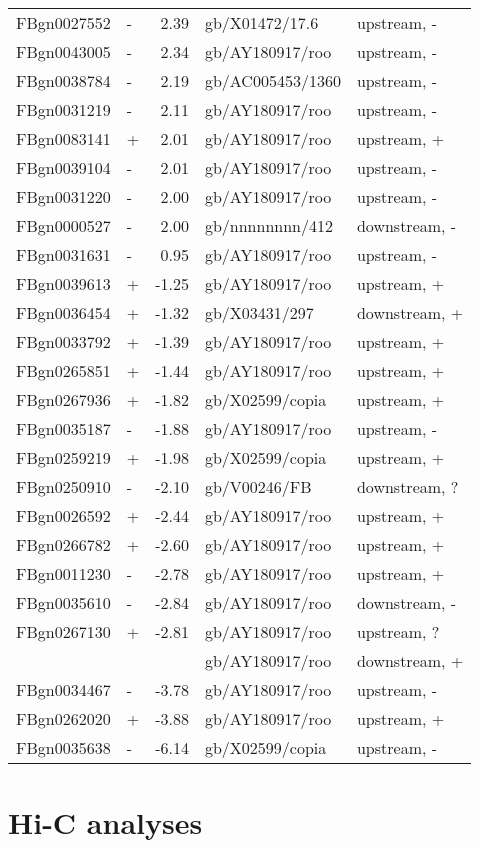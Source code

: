 {\begin{longtable}{llrll}
    FBgn0027552 &   -   &   2.39    &    gb/X01472/17.6     &   upstream, -     \\
    FBgn0043005 &   -   &   2.34    &    gb/AY180917/roo    &   upstream, -     \\
    FBgn0038784 &   -   &   2.19    &    gb/AC005453/1360   &   upstream, -     \\
    FBgn0031219 &   -   &   2.11    &    gb/AY180917/roo    &   upstream, -     \\
    FBgn0083141 &   +   &   2.01    &    gb/AY180917/roo    &   upstream, +     \\
    FBgn0039104 &   -   &   2.01    &    gb/AY180917/roo    &   upstream, -     \\
    FBgn0031220 &   -   &   2.00    &    gb/AY180917/roo    &   upstream, -     \\
    FBgn0000527 &   -   &   2.00    &    gb/nnnnnnnn/412    &   downstream, -   \\
    FBgn0031631 &   -   &   0.95    &    gb/AY180917/roo    &   upstream, -     \\
    FBgn0039613 &   +   &   -1.25   &    gb/AY180917/roo    &   upstream, +     \\
    FBgn0036454 &   +   &   -1.32   &    gb/X03431/297      &   downstream, +   \\
    FBgn0033792 &   +   &   -1.39   &    gb/AY180917/roo    &   upstream, +     \\
    FBgn0265851 &   +   &   -1.44   &    gb/AY180917/roo    &   upstream, +     \\
    FBgn0267936 &   +   &   -1.82   &    gb/X02599/copia    &   upstream, +     \\
    FBgn0035187 &   -   &   -1.88   &    gb/AY180917/roo    &   upstream, -     \\
    FBgn0259219 &   +   &   -1.98   &    gb/X02599/copia    &   upstream, +     \\
    FBgn0250910 &   -   &   -2.10   &    gb/V00246/FB       &   downstream, ?   \\
    FBgn0026592 &   +   &   -2.44   &    gb/AY180917/roo    &   upstream, +     \\
    FBgn0266782 &   +   &   -2.60   &    gb/AY180917/roo    &   upstream, +     \\
    FBgn0011230 &   -   &   -2.78   &    gb/AY180917/roo    &   upstream, +     \\
    FBgn0035610 &   -   &   -2.84   &    gb/AY180917/roo    &   downstream, -   \\
    FBgn0267130 &   +   &   -2.81   &    gb/AY180917/roo    &   upstream, ?     \\
                &       &           &    gb/AY180917/roo    &   downstream, +   \\
    FBgn0034467 &   -   &   -3.78   &    gb/AY180917/roo    &   upstream, -     \\
    FBgn0262020 &   +   &   -3.88   &    gb/AY180917/roo    &   upstream, +     \\
    FBgn0035638 &   -   &   -6.14   &    gb/X02599/copia    &   upstream, -     \\
    \bottomrule
\end{longtable}
}





\section{Hi-C analyses}
\label{sec:suppl_hic}
